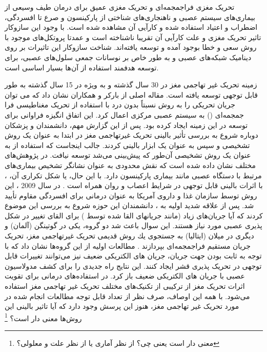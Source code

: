 تحریک مغزی فراجمجمه‌ای و تحریک مغزی عمیق برای درمان طیف وسیعی از بیماری‌های سیستم عصبی و ناهنجاری‌های شناختی از پارکینسون و صرع تا افسردگی، اضطراب و اعتیاد استفاده شده و کارآیی آن مشاهده شده است. با وجود این سازوکار تاثیر تحریک مغزی و علت کارآیی آن تقریبا ناشناخته است و عمدتا پروتکل‌های موجود با روش سعی و خطا بوجود آمده و توسعه یافته‌اند. شناخت سازوکار این تاثیرات بر روی دینامیک شبکه‌های عصبی و به طور خاص بر نوسانات جمعی سلول‌های عصبی، برای توسعه هدفمند استفاده از آن‌ها بسیار اساسی است. 


زمینه تحریک غیر تهاجمی مغز در 30 سال گذشته و به ویژه در 15 سال گذشته به طور قابل توجهی توسعه یافته است. مقاله اصلی از بارکر و همکاران 
\cite{barker1985non}
نشان داد كه می توان جریان تحریكی را به روش نسبتاً بدون درد با استفاده از تحریک مغناطیسی فرا جمجمه‌ای
 () 
به سیستم عصبی مركزی اعمال کرد. این اتفاق انگیزه فراوانی برای توسعه در این زمینه ایجاد کرده بود. پس از این گزارش مهم، دانشمندان و پزشکان دوباره شروع به بررسی تأثیر بالینی تحریک غیرتهاجمی مغز در ابتدا به عنوان یک روش تشخیصی و سپس به عنوان یک ابزار بالینی کردند.
جالب اینجاست که استفاده از
به عنوان یک روش تشخیصی آن‌طور که پیش‌بینی می‌شد توسعه نیافت. در پژوهش‌های مختلف نشان داده شده است که
نقش محدودی به عنوان نشانگر تشخیص بیماری‌های مرتبط با دستگاه عصبی مانند بیماری پارکینسون دارد. با این حال، 
 یا شکل تکراری آن، 
، با اثرات بالینی قابل توجهی در شرایط اعصاب و روان همراه است
\cite{rossi2009safety}
. در سال 2009 ، این روش توسط سازمان غذا و داروی آمریکا 
 به عنوان درمانی برای افسردگی مقاوم 
تأیید شد.
پس از علاقه شدید اولیه به 
، دانشمندان این حوزه شروع به بررسی این موضوع کردند که آیا جریان‌های زیاد (مانند جریانهای القا شده توسط 
) برای القای تغییر در شکل پذیری عصبی مورد نیاز هستند. این سوال باعث شد دو گروه، یكی در گوتینگن (آلمان) و دیگری در میلان (ایتالیا) به جستجوی یك روش قدیمی تحریک غیرتهاجمی مغز، تحریک جریان مستقیم فراجمجمه‌ای 
بپردازند
\cite{nitsche2008transcranial}.
مطالعات اولیه از این گروه‌ها نشان داد که با توجه به ثابت بودن جهت جریان‌، جریان های الکتریکی ضعیف نیز می‌توانند تغییرات قابل توجهی در تحریک پذیری قشر ایجاد کنند. این نتایج راه جدیدی را برای کشف مدولاسیون عصبی با جریان های الکتریکی ضعیف باز کرد. در استفاده‌های درمانی برای تقویت اثرات تحریک مغز از ترکیبی از تکنیک‌های مختلف تحریک غیر تهاجمی مغز استفاده می‌شود. با همه این اوصاف، صرف نظر از تعداد قابل توجه مطالعات انجام شده در مورد تحریک غیر تهاجمی مغز، هنوز این پرسش وجود دارد که آیا تاثیر بالینی این روش‌ها معنی دار است؟
\footnote{معنی دار است یعنی چی؟ از نظر آماری یا از نظر علت و معلولی؟}


